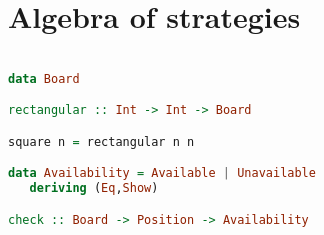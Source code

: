 \documentclass[10pt]{beamer}
\begin{document}
\section{Algebra of strategies}

\begin{frame}[fragile]
\begin{lstlisting}[language=haskell, basicstyle=\ttfamily]

data Board 

rectangular :: Int -> Int -> Board 

square n = rectangular n n 

data Availability = Available | Unavailable
   deriving (Eq,Show)

check :: Board -> Position -> Availability 

\end{lstlisting}
\end{frame}
\end{document}
